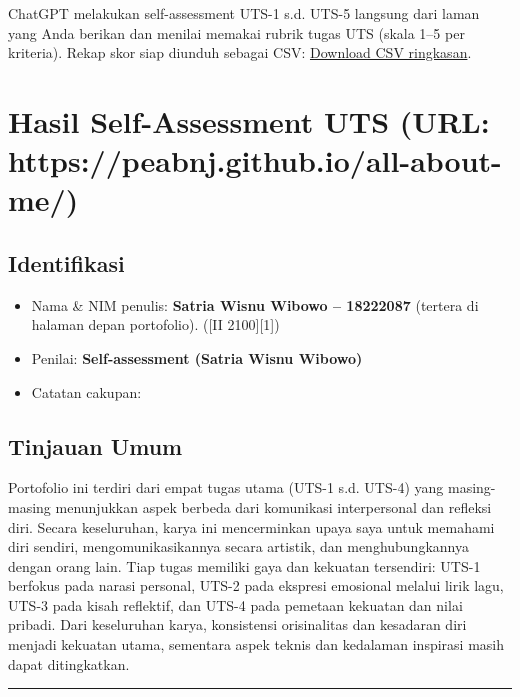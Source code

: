 \documentclass[
  letterpaper,
  DIV=11,
  numbers=noendperiod]{scrreprt}
\providecommand{\tightlist}{%
  \setlength{\itemsep}{0pt}\setlength{\parskip}{0pt}}
\begin{document}
ChatGPT melakukan self-assessment UTS-1 s.d. UTS-5 langsung dari laman
yang Anda berikan dan menilai memakai rubrik tugas UTS (skala 1--5 per
kriteria). Rekap skor siap diunduh sebagai CSV:
\href{sandbox:/mnt/data/UTS_self_assessment.csv}{Download CSV
ringkasan}.


\chapter{Hasil Self-Assessment UTS (URL:
https://peabnj.github.io/all-about-me/)}\label{hasil-self-assessment-uts-url-httpspeabnj.github.ioall-about-me}

\section{Identifikasi}\label{identifikasi}

\begin{itemize}
\tightlist
\item
  Nama \& NIM penulis: \textbf{Satria Wisnu Wibowo -- 18222087} (tertera
  di halaman depan portofolio). ({[}II 2100{]}{[}1{]})
\item
  Penilai: \textbf{Self-assessment (Satria Wisnu Wibowo)}
\item
  Catatan cakupan:
\end{itemize}

\section{Tinjauan Umum}\label{tinjauan-umum}

Portofolio ini terdiri dari empat tugas utama (UTS-1 s.d. UTS-4) yang
masing-masing menunjukkan aspek berbeda dari komunikasi interpersonal
dan refleksi diri. Secara keseluruhan, karya ini mencerminkan upaya saya
untuk memahami diri sendiri, mengomunikasikannya secara artistik, dan
menghubungkannya dengan orang lain. Tiap tugas memiliki gaya dan
kekuatan tersendiri: UTS-1 berfokus pada narasi personal, UTS-2 pada
ekspresi emosional melalui lirik lagu, UTS-3 pada kisah reflektif, dan
UTS-4 pada pemetaan kekuatan dan nilai pribadi. Dari keseluruhan karya,
konsistensi orisinalitas dan kesadaran diri menjadi kekuatan utama,
sementara aspek teknis dan kedalaman inspirasi masih dapat ditingkatkan.

\begin{center}\rule{0.5\linewidth}{0.5pt}\end{center}
\end{document}
